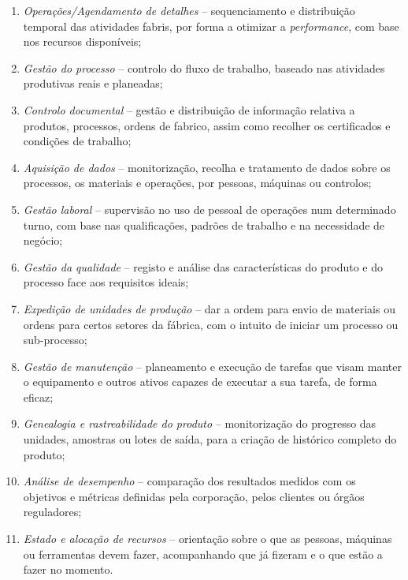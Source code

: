 \begin{enumerate}
    \item 
    {
        \textit{Operações/Agendamento de detalhes} -- sequenciamento e distribuição temporal das atividades fabris, por forma a otimizar a \textit{performance}, com base nos recursos disponíveis;
    }
    \item
    {
        \textit{Gestão do processo} -- controlo do fluxo de trabalho, baseado nas atividades produtivas reais e planeadas;
    }
    \item
    {
        \textit{Controlo documental} -- gestão e distribuição de informação relativa a produtos, processos, ordens de fabrico, assim como recolher os certificados e condições de trabalho;
    }
    \item
    {
        \textit{Aquisição de dados} -- monitorização, recolha e tratamento de dados sobre os processos, os materiais e operações, por pessoas, máquinas ou controlos;
    }
    \item
    {
        \textit{Gestão laboral} -- supervisão no uso de pessoal de operações num determinado turno, com base nas qualificações, padrões de trabalho e na necessidade de negócio;
    }
    \item
    {
        \textit{Gestão da qualidade} -- registo e análise das características do produto e do processo face aos requisitos ideais;
    }
    \item
    {
        \textit{Expedição de unidades de produção} -- dar a ordem para envio de materiais ou ordens para certos setores da fábrica, com o intuito de iniciar um processo ou sub-processo;
    }
    \item
    {
        \textit{Gestão de manutenção} -- planeamento e execução de tarefas que visam manter o equipamento e outros ativos capazes de executar a sua tarefa, de forma eficaz;
    }
    \item
    {
        \textit{Genealogia e rastreabilidade do produto} -- monitorização do progresso das unidades, amostras ou lotes de saída, para a criação de histórico completo do produto;
    }
    \item
    {
        \textit{Análise de desempenho} -- comparação dos resultados medidos com os objetivos e métricas definidas pela corporação, pelos clientes ou órgãos reguladores;
    }
    \item
    {
        \textit{Estado e alocação de recursos} -- orientação sobre o que as pessoas, máquinas ou ferramentas devem fazer, acompanhando que já fizeram e o que estão a fazer no momento.
    }
\end{enumerate}

